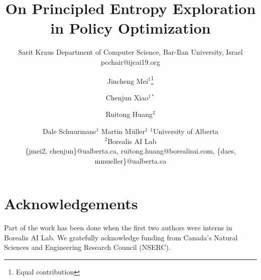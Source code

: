 \documentclass{article}
\title{On Principled Entropy Exploration in Policy Optimization}
\author{
    Sarit Kraus
    \affiliations
    Department of Computer Science, Bar-Ilan University, Israel \emails
    pcchair@ijcai19.org
}
\author{
Jincheng Mei$^{1}$\thanks{Equal contribution}\and
Chenjun Xiao$^{1 *}$\and
Ruitong Huang$^{2}$\and
Dale Schuurmans$^1$\And
Martin M{\" u}ller$^1$
\affiliations
$^1$University of Alberta\\
$^2$Borealis AI Lab\\
\emails
\{jmei2, chenjun\}@ualberta.ca,
ruitong.huang@borealisai.com,
\{daes, mmueller\}@ualberta.ca
}
\begin{document}
\maketitle

\begin{abstract}

\end{abstract}















\section*{Acknowledgements}
Part of the work has been done when the first two authors were interns in Borealis AI Lab. We gratefully acknowledge funding from Canada's Natural Sciences and Engineering Research Council (NSERC).




\onecolumn
\appendix

\end{document}
